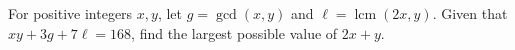 For positive integers $x,y$, let $g=\gcd(x,y)$ and $\ell=\operatorname{lcm}(2x,y)$. Given that $xy+3g+7\ell=168$, find the largest possible value of $2x+y$.
